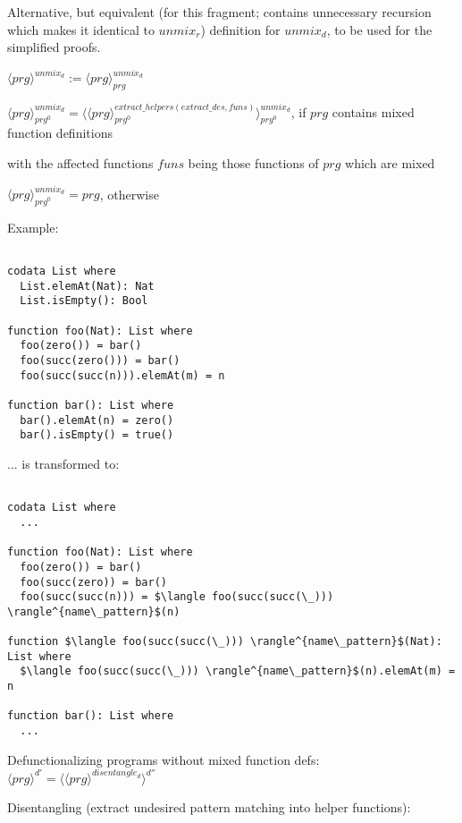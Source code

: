 \documentclass[11pt]{article} %
\begin{document}
\begin{framed}
Alternative, but equivalent (for this fragment; contains unnecessary recursion which makes it identical to $unmix_r$) definition for $unmix_d$, to be used for the simplified proofs.

$\langle prg \rangle^{unmix_d} := \langle prg \rangle^{unmix_d}_{prg}$

$\langle prg \rangle^{unmix_d}_{prg^0} = \langle \langle prg \rangle^{extract\_helpers(extract\_des, funs)}_{prg^0} \rangle^{unmix_d}_{prg^0}$, if $prg$ contains mixed function definitions

with the affected functions $funs$ being those functions of $prg$ which are mixed

$\langle prg \rangle^{unmix_d}_{prg^0} = prg$, otherwise

\end{framed}

Example:

\begin{lstlisting}  

codata List where
  List.elemAt(Nat): Nat
  List.isEmpty(): Bool

function foo(Nat): List where
  foo(zero()) = bar()
  foo(succ(zero())) = bar()
  foo(succ(succ(n))).elemAt(m) = n

function bar(): List where
  bar().elemAt(n) = zero()
  bar().isEmpty() = true()

\end{lstlisting}

... is transformed to:

\begin{lstlisting}[mathescape]

codata List where
  ...

function foo(Nat): List where
  foo(zero()) = bar()
  foo(succ(zero)) = bar()
  foo(succ(succ(n))) = $\langle foo(succ(succ(\_))) \rangle^{name\_pattern}$(n)

function $\langle foo(succ(succ(\_))) \rangle^{name\_pattern}$(Nat): List where
  $\langle foo(succ(succ(\_))) \rangle^{name\_pattern}$(n).elemAt(m) = n

function bar(): List where
  ...

\end{lstlisting}

Defunctionalizing programs without mixed function defs: $\langle prg \rangle^{d'} = \langle \langle prg \rangle^{disentangle_d} \rangle^{d''}$

Disentangling (extract undesired pattern matching into helper functions):
\end{document}
